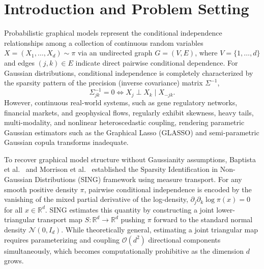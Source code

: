 \documentclass[11pt,a4paper]{article}
\theoremstyle{plain}
\theoremstyle{definition}
\theoremstyle{remark}
\begin{document}
\tableofcontents
\newpage

\section{Introduction and Problem Setting}

Probabilistic graphical models represent the conditional independence relationships among a collection of continuous random variables $X = (X_1, \dots, X_d) \sim \pi$ via an undirected graph $G = (V, E)$, where $V = \{1, \dots, d\}$ and edges $(j, k) \in E$ indicate direct pairwise conditional dependence. For Gaussian distributions, conditional independence is completely characterized by the sparsity pattern of the precision (inverse covariance) matrix $\Sigma^{-1}$,
\begin{equation}
    \Sigma^{-1}_{jk} = 0 \iff X_j \perp X_k \mid X_{-jk}.
\end{equation}
However, continuous real-world systems, such as gene regulatory networks, financial markets, and geophysical flows, regularly exhibit skewness, heavy tails, multi-modality, and nonlinear heteroscedastic coupling, rendering parametric Gaussian estimators such as the Graphical Lasso (GLASSO) \cite{friedman2007sparse} and semi-parametric Gaussian copula transforms \cite{liu2009nonparanormal} inadequate.

To recover graphical model structure without Gaussianity assumptions, Baptista et al.\ \cite{baptista2024learning} and Morrison et al.\ \cite{morrison2017beyond} established the Sparsity Identification in Non-Gaussian Distributions (SING) framework using measure transport. For any smooth positive density $\pi$, pairwise conditional independence is encoded by the vanishing of the mixed partial derivative of the log-density, $\partial_j \partial_k \log \pi(x) = 0$ for all $x \in \mathbb{R}^d$. SING estimates this quantity by constructing a joint lower-triangular transport map $S: \mathbb{R}^d \to \mathbb{R}^d$ pushing $\pi$ forward to the standard normal density $\mathcal{N}(0, I_d)$. While theoretically general, estimating a joint triangular map requires parameterizing and coupling $\mathcal{O}(d^2)$ directional components simultaneously, which becomes computationally prohibitive as the dimension $d$ grows.
\end{document}
